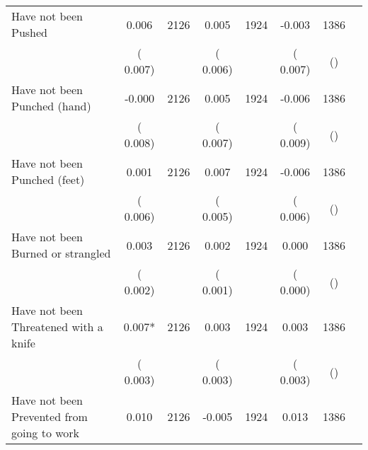 \begin{tabular}{l*{6}{c}}
Have not been Pushed        &              0.006      &       2126       &              0.005      &       1924       &             -0.003      &       1386  &  &              \\
                       &       (       0.007)            &                               &       (       0.006)            &                               &       (       0.007)            &       () &                  \\
Have not been Punched (hand)        &             -0.000      &       2126       &              0.005      &       1924       &             -0.006      &       1386  &  &              \\
                       &       (       0.008)            &                               &       (       0.007)            &                               &       (       0.009)            &       () &                  \\
Have not been Punched (feet)        &              0.001      &       2126       &              0.007      &       1924       &             -0.006      &       1386  &  &              \\
                       &       (       0.006)            &                               &       (       0.005)            &                               &       (       0.006)            &       () &                  \\
Have not been Burned or strangled        &              0.003      &       2126       &              0.002      &       1924       &              0.000      &       1386  &  &              \\
                       &       (       0.002)            &                               &       (       0.001)            &                               &       (       0.000)            &       () &                  \\
Have not been Threatened with a knife        &              0.007*      &       2126       &              0.003      &       1924       &              0.003      &       1386  &  &              \\
                       &       (       0.003)            &                               &       (       0.003)            &                               &       (       0.003)            &       () &                  \\
Have not been Prevented from going to work        &              0.010      &       2126       &             -0.005      &       1924       &              0.013      &       1386  &  &              \\

\end{tabular}
